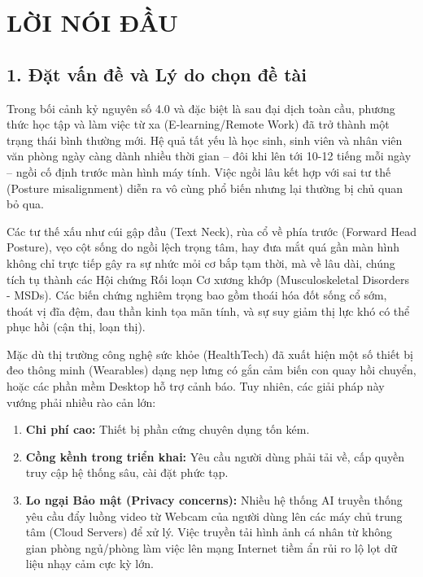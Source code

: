 \documentclass[12pt,a4paper]{report}
\begin{document}
\chapter*{LỜI NÓI ĐẦU}

\section*{1. Đặt vấn đề và Lý do chọn đề tài}
Trong bối cảnh kỷ nguyên số 4.0 và đặc biệt là sau đại dịch toàn cầu, phương thức học tập và làm việc từ xa (E-learning/Remote Work) đã trở thành một trạng thái bình thường mới. Hệ quả tất yếu là học sinh, sinh viên và nhân viên văn phòng ngày càng dành nhiều thời gian – đôi khi lên tới 10-12 tiếng mỗi ngày – ngồi cố định trước màn hình máy tính. Việc ngồi lâu kết hợp với sai tư thế (Posture misalignment) diễn ra vô cùng phổ biến nhưng lại thường bị chủ quan bỏ qua. 

Các tư thế xấu như cúi gập đầu (Text Neck), rùa cổ về phía trước (Forward Head Posture), vẹo cột sống do ngồi lệch trọng tâm, hay đưa mắt quá gần màn hình không chỉ trực tiếp gây ra sự nhức mỏi cơ bắp tạm thời, mà về lâu dài, chúng tích tụ thành các Hội chứng Rối loạn Cơ xương khớp (Musculoskeletal Disorders - MSDs). Các biến chứng nghiêm trọng bao gồm thoái hóa đốt sống cổ sớm, thoát vị đĩa đệm, đau thần kinh tọa mãn tính, và sự suy giảm thị lực khó có thể phục hồi (cận thị, loạn thị).

Mặc dù thị trường công nghệ sức khỏe (HealthTech) đã xuất hiện một số thiết bị đeo thông minh (Wearables) dạng nẹp lưng có gắn cảm biến con quay hồi chuyển, hoặc các phần mềm Desktop hỗ trợ cảnh báo. Tuy nhiên, các giải pháp này vướng phải nhiều rào cản lớn:
\begin{enumerate}
    \item \textbf{Chi phí cao:} Thiết bị phần cứng chuyên dụng tốn kém.
    \item \textbf{Cồng kềnh trong triển khai:} Yêu cầu người dùng phải tải về, cấp quyền truy cập hệ thống sâu, cài đặt phức tạp.
    \item \textbf{Lo ngại Bảo mật (Privacy concerns):} Nhiều hệ thống AI truyền thống yêu cầu đẩy luồng video từ Webcam của người dùng lên các máy chủ trung tâm (Cloud Servers) để xử lý. Việc truyền tải hình ảnh cá nhân từ không gian phòng ngủ/phòng làm việc lên mạng Internet tiềm ẩn rủi ro lộ lọt dữ liệu nhạy cảm cực kỳ lớn.
\end{enumerate}
\end{document}
